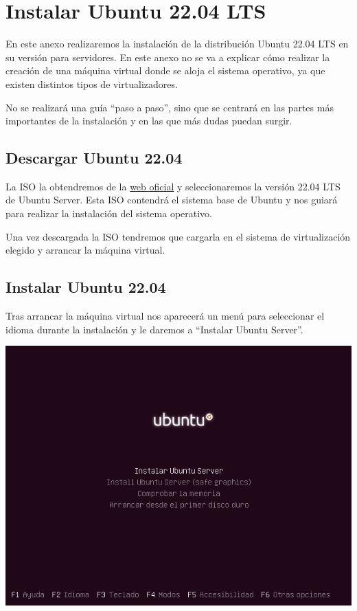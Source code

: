 \hypertarget{instalar_ubuntu_lts}{}

\chapter{Instalar Ubuntu 22.04 LTS}
En este anexo realizaremos la instalación de la distribución Ubuntu 22.04 LTS en su versión para servidores. En este anexo no se va a explicar cómo realizar la creación de una máquina virtual donde se aloja el sistema operativo, ya que existen distintos tipos de virtualizadores.

No se realizará una guía “paso a paso”, sino que se centrará en las partes más importantes de la instalación y en las que más dudas puedan surgir.

\section{Descargar Ubuntu 22.04}
La ISO la obtendremos de la \href{https://ubuntu.com/#download}{web oficial} y seleccionaremos la versión 22.04 LTS de Ubuntu Server. Esta ISO contendrá el sistema base de Ubuntu y nos guiará para realizar la instalación del sistema operativo.

Una vez descargada la ISO tendremos que cargarla en el sistema de virtualización elegido y arrancar la máquina virtual.


\section{Instalar Ubuntu 22.04}
Tras arrancar la máquina virtual nos aparecerá un menú para seleccionar el idioma durante la instalación y le daremos a “Instalar Ubuntu Server”.

\begin{center}
    \vspace{-10pt}
    \includegraphics[width=15cm]{ubuntu_1.png}
    \vspace{-20pt}
\end{center}

